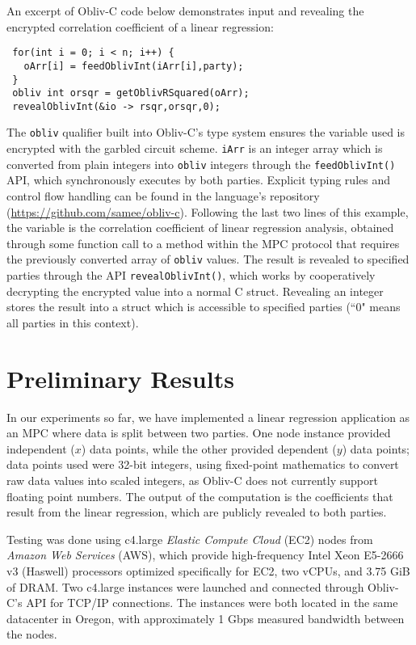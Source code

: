 \documentclass[conference]{IEEEtran}
\begin{document}
An excerpt of Obliv-C code below demonstrates input and revealing the 
encrypted correlation coefficient of a linear regression:
\begin{verbatim}
 for(int i = 0; i < n; i++) {
   oArr[i] = feedOblivInt(iArr[i],party);
 }
 obliv int orsqr = getOblivRSquared(oArr);
 revealOblivInt(&io -> rsqr,orsqr,0);
\end{verbatim}
\noindent
The {\tt obliv} qualifier built into Obliv-C’s type system ensures
the variable used is encrypted with the garbled circuit 
scheme\cite{cryptoeprint:2015:1153}. {\tt iArr} is an integer array which is 
converted from plain integers into {\tt obliv}
integers through the {\tt feedOblivInt()} API, which synchronously executes 
by both parties. Explicit typing rules and control flow handling can be found in
the language's repository (\url{https://github.com/samee/obliv-c}).
Following the last two lines of this example, the variable is the
correlation coefficient of linear regression analysis, obtained through
some function call to a method within the MPC protocol that requires the
previously converted array of {\tt obliv} values. The result is
revealed to specified parties through the API {\tt revealOblivInt()},
which works by cooperatively decrypting the encrypted value into a
normal C struct.  Revealing an integer stores the result into a struct
which is accessible to specified parties (``0" means all parties in this
context).

\section{Preliminary Results}

In our experiments so far, we have implemented a linear regression
application as an MPC where data is split between two parties.  One node
instance provided independent ($x$) data points, while the other
provided dependent ($y$) data points; data points used were 32-bit
integers, using fixed-point mathematics to convert raw data values into
scaled integers, as Obliv-C does not currently support floating point
numbers.  The output of the computation is the coefficients that result
from the linear regression, which are publicly revealed to both parties.

Testing was done using c4.large \emph{Elastic Compute Cloud} (EC2) nodes
from \emph{Amazon Web Services} (AWS)\cite{aws:ec2}, which provide
high-frequency Intel Xeon E5-2666 v3 (Haswell) processors optimized
specifically for EC2, two vCPUs, and 3.75 GiB of DRAM.  Two c4.large
instances were launched and connected through Obliv-C's API for TCP/IP
connections. The instances were both located in the same datacenter in
Oregon, with approximately 1 Gbps measured bandwidth between the
nodes. 
\end{document}
